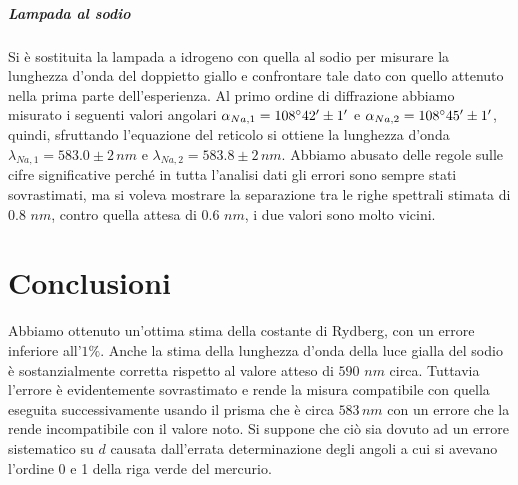 \documentclass[10pt,a4paper]{article}
\begin{document}
\subparagraph{Lampada al sodio}
Si è sostituita la lampada a idrogeno con quella al sodio per misurare la lunghezza d'onda del doppietto giallo e confrontare tale dato con quello attenuto nella prima parte dell'esperienza. Al primo ordine di diffrazione abbiamo misurato i seguenti valori angolari $\alpha_{Na,1}= 108\degree 42'\pm 1' $ e $\alpha_{Na,2}=108\degree 45' \pm 1'$, quindi, sfruttando l'equazione del reticolo si ottiene la lunghezza d'onda $\lambda_{Na,1}=583.0 \pm 2 \,nm$ e $\lambda_{Na,2}=583.8 \pm 2 \,nm$.
Abbiamo abusato delle regole sulle cifre significative perché in tutta l'analisi dati gli errori sono sempre stati sovrastimati, ma si voleva mostrare la separazione tra le righe spettrali stimata di $0.8 \, \,nm$, contro quella attesa di $0.6 \, \,nm$, i due valori sono molto vicini.\\

\section{Conclusioni}
Abbiamo ottenuto un'ottima stima della costante di Rydberg, con un errore inferiore all'$1\%$. Anche la stima della lunghezza d'onda della luce gialla del sodio è sostanzialmente corretta rispetto al valore atteso di $590 \, \,nm$ circa. Tuttavia l'errore è evidentemente sovrastimato e rende la misura  compatibile con quella eseguita successivamente usando il prisma che è circa $583\,nm$ con un errore che la rende incompatibile con il valore noto. Si suppone che ciò sia dovuto ad un errore sistematico su $d$ causata dall'errata determinazione degli angoli a cui si avevano l'ordine 0 e 1 della riga verde del mercurio.\\
\end{document}
